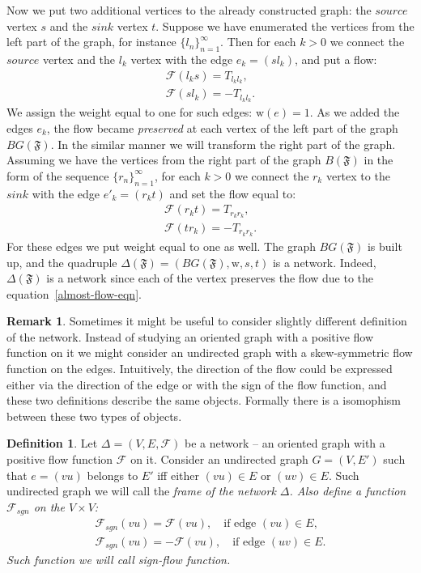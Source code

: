 \documentclass[12pt]{article}
\theoremstyle{definition}
\newtheorem{remark}{Remark}
\newtheorem{definition}{Definition}
\newcommand{\seq}[1]{\{{#1}_n\}_{n=1}^\infty}
\newcommand{\fsys}{\mathfrak{F}}
\newcommand{\wt}{\mathrm{w}}
\newcommand{\flow}{\mathcal{F}}
\newcommand{\flowsgn}{\mathcal{F}_{sgn}}
\newcommand{\source}{\mathit{source}}
\newcommand{\sink}{\mathit{sink}}
\newcommand{\net}{\Delta}
\numberwithin{remark}{section}
\numberwithin{theorem}{section}
\numberwithin{prop}{section}
\numberwithin{equation}{section}
\numberwithin{lemma}{section}
\numberwithin{prop_under_lemma}{lemma}
\begin{document}
    Now we put two additional vertices to the already constructed graph:
    the $\source$ vertex $s$ and the $\sink$ vertex $t$.
    Suppose we have enumerated the vertices from the left part of the graph, for instance $\seq{l}$.
    Then for each $k > 0$ we connect the $\source$ vertex and the $l_k$ vertex with
    the edge $e_k = (s l_k)$, and put a flow:
    \begin{align*}
      \flow(l_k s) = T_{l_k l_k},\\
      \flow(s l_k) = -T_{l_k l_k}.
    \end{align*}
    We assign the weight equal to one for such edges: $\wt(e) = 1$.
    As we added the edges ${e_k}$, the flow became \emph{preserved} at each vertex of the left part of the graph $BG(\fsys)$.
    In the similar manner we will transform the right part of the graph.
    Assuming we have the vertices from the right part of the graph $B(\fsys)$ in the form of the sequence $\seq{r}$,
    for each $k > 0$ we connect the $r_k$ vertex to the $\sink$ with the edge $e'_k=(r_k t)$
    and set the flow equal to:
    \begin{align*}
      \flow(r_k t) = T_{r_k r_k},\\
      \flow(t r_k) = -T_{r_k r_k}.
    \end{align*}
    For these edges we put weight equal to one as well.
    The graph $BG(\fsys)$ is built up, and the quadruple $\net(\fsys) = (BG(\fsys), \wt, s, t)$ is a network.
    Indeed, $\net(\fsys)$ is a network since each of the vertex preserves
    the flow due to the equation~\eqref{almost-flow-eqn}.
    \begin{remark}
      Sometimes it might be useful to consider slightly different definition of the network.
      Instead of studying an oriented graph with a positive flow function on it we might consider
      an undirected graph with a skew-symmetric flow function on the edges.
      Intuitively, the direction of the flow could be expressed either via the direction of the edge
      or with the sign of the flow function, and these two definitions describe the same objects.
      Formally there is a isomophism between these two types of objects.
    \end{remark}
    \begin{definition}
      Let $\net=(V,E,\flow)$ be a network -- an oriented graph with a positive flow function $\flow$ on it.
      Consider an undirected graph $G=(V,E')$ such that $e=(vu)$ belongs to $E'$ iff
      either $(vu) \in E$ or $(uv) \in E$.
      Such undirected graph we will call the \it{frame} of the network $\net$.
      Also define a function $\flowsgn$ on the $V \times V$:
      \begin{align*}
        \flowsgn(vu) = \flow(vu), \quad \text{if edge } (vu) \in E,\\
        \flowsgn(vu) = -\flow(vu), \quad \text{if edge } (uv) \in E.
      \end{align*}
      Such function we will call \it{sign-flow} function.
    \end{definition}
\end{document}
